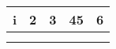 \begin{tabular}{ c c c c c }
    i & 2 & 3 & 45 & 6 \\ 
  \hline  
     &  &  &  &  \\ 
     &  &  &  &  \\ 
\end{tabular}